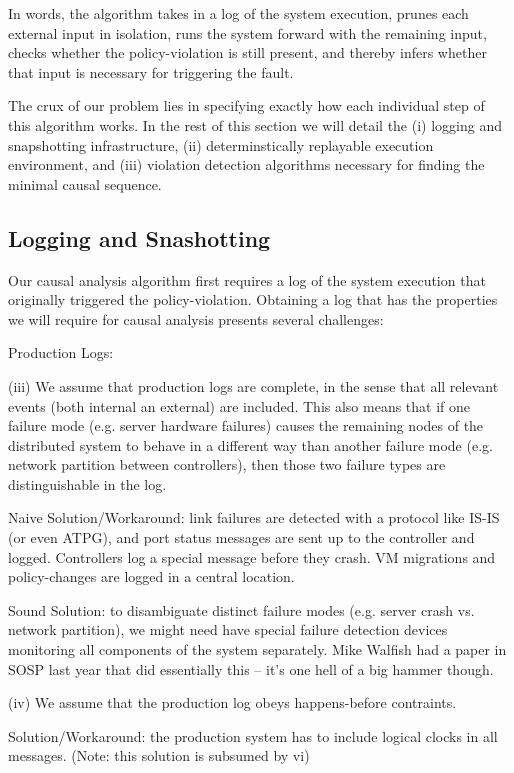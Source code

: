 \noindent In words, the algorithm takes in a log of the system execution,
prunes each external input in isolation,
runs the system forward with the remaining input, checks whether the
policy-violation is still present, and thereby infers whether that input is
necessary for triggering the fault.

The crux of our problem lies in specifying exactly how each
individual step of this algorithm works. In the rest of this section we will
detail the (i) logging and snapshotting infrastructure, (ii) determinstically
replayable execution environment, and (iii) violation detection algorithms
necessary for finding the minimal causal sequence.

\subsection{Logging and Snashotting}

Our causal analysis algorithm first requires a log of the system execution
that originally triggered the policy-violation. Obtaining a log that has the
properties we will require for causal analysis presents several challenges:

Production Logs:

(iii) We assume that production logs are complete, in the sense that all relevant events (both internal an external) are included. This also means that if one failure mode (e.g. server hardware failures) causes the remaining nodes of the distributed system to behave in a different way than another failure mode (e.g. network partition between controllers), then those two failure types are distinguishable in the log. 

Naive Solution/Workaround: link failures are detected with a protocol like IS-IS (or even ATPG), and port status messages are sent up to the controller and logged. Controllers log a special message before they crash. VM migrations and policy-changes are logged in a central location.

Sound Solution: to disambiguate distinct failure modes (e.g. server crash vs. network partition), we might need have special failure detection devices monitoring all components of the system separately. Mike Walfish had a paper in SOSP last year that did essentially this -- it's one hell of a big hammer though.
                           
(iv) We assume that the production log obeys happens-before contraints.
 
Solution/Workaround: the production system has to include logical clocks in all messages. (Note: this solution is subsumed by vi)                                                                                      
                 
